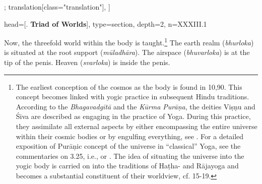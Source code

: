 \begin{alignment}[
  texts=edition[class="edition"];
  translation[class="translation"],
  ]
\begin{translation}
{          head={[. \textbf{Triad of Worlds}]},
          type=section,
          depth=2, 
          n=XXXIII.1
        }
\begin{tlate}[p33_01]
  \noindent
  \begin{euber}[f32_1]\end{euber}
Now, the threefold world within the body is taught.\footnote{The earliest conception of the cosmos as the body is found in  10,90. This concept becomes linked with yogic practice in subsequent Hindu traditions. According to the \textit{Bhagavadgītā} and the \textit{Kūrma Purāṇa}, the deities Viṣṇu and Śiva are described as engaging in the practice of Yoga. During this practice, they assimilate all external aspects by either encompassing the entire universe within their cosmic bodies or by engulfing everything, see \citeauthor[2011:88]{white2011}. For a detailed exposition of Purāṇic concept of the universe in ``classical'' Yoga, see the commentaries on  3.25, i.e., \citeauthor[1983: 297-304]{aranya} or \citeauthor[2009:353-356]{bryant2009}. The idea of situating the universe into the yogic body is carried on into the traditions of Haṭha- and Rājayoga and becomes a substantial constituent of their worldview, cf.  15-19.} The earth realm (\textit{bhurloka}) is situated at the root support (\textit{mūladhāra}). The airspace (\textit{bhuvarloka}) is at the tip of the penis. Heaven (\textit{svarloka}) is inside the penis.

\end{tlate}
\end{translation}
\end{alignment}
